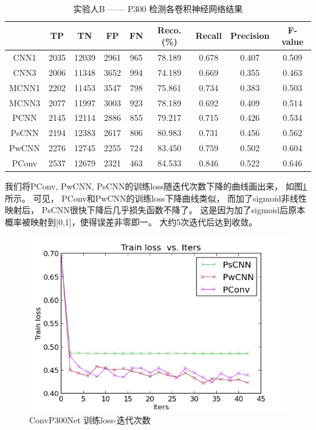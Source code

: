 \begin{table}[ht]
\centering
  \begin{tabular}{|c||c|c|c|c|c|c|c|c|}
  \hline
   & TP & TN & FP & FN & Reco.(\%) & Recall & Precision & F-value \\
  \hline\hline
   CNN1 & 2035 & 12039 & 2961 & 965 & 78.189 &  0.678 & 0.407 & 0.509\\
  \hline
   CNN3 & 2006 & 11348 & 3652 & 994 & 74.189 & 0.669 & 0.355 & 0.463\\
  \hline
   MCNN1 & 2202 &11453 & 3547 & 798 & 75.861 & 0.734 & 0.383 & 0.503 \\
 \hline
  MCNN3 & 2077 & 11997 & 3003 & 923 & 78.189 & 0.692 & 0.409 & 0.514 \\
\hline
  PCNN & 2145 & 12114 & 2886 & 855 & 79.217  & 0.715  & 0.426 & 0.534 \\
\hline
  PsCNN & 2194 &12383 & 2617 & 806 & 80.983 & 0.731 & 0.456 & 0.562 \\
\hline
  PwCNN & 2276 & 12745 & 2255 & 724 & 83.450 & 0.759 & 0.502 & 0.604 \\
\hline 
  PConv & 2537 & 12679 & 2321 & 463 & 84.533 & 0.846 & 0.522 & 0.646 \\
  \hline
  \end{tabular}
  \caption{实验人B —— P300 检测各卷积神经网络结果}
  \centering \label{tab:p300_cnn_B}
\end{table}



我们将PConv, PwCNN, PsCNN的训练loss随迭代次数下降的曲线画出来， 如图\ref{fig:train_loss}所示。 可见， PConv和PwCNN的训练loss下降曲线类似， 而加了sigmoid非线性映射后， PsCNN很快下降后几乎损失函数不降了。 这是因为加了sigmoid后原本概率被映射到[0,1]，使得误差非零即一。  大约5次迭代后达到收敛。


\begin{figure}[htb]
  \centering
  \includegraphics[scale=0.9]{Pictures/CNN/train_loss.png}
  \caption{ConvP300Net 训练loss-迭代次数}\label{fig:train_loss}
\end{figure}


